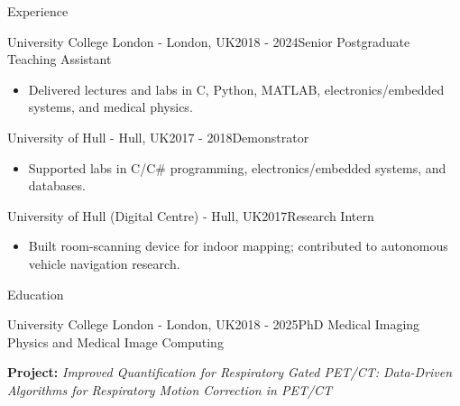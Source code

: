 \documentclass{cv}
\begin{document}
\begin{spacing}{1.1}
\begin{rSection}{Experience}
            \item \begin{rSubsection}{University College London \textnormal{- London, UK}}{2018 - 2024}{Senior Postgraduate Teaching Assistant}{}
                \item \begin{itemize}
                    \item Delivered lectures and labs in C, Python, MATLAB, electronics/embedded systems, and medical physics.
                \end{itemize}
            \end{rSubsection}
            
            \item \begin{rSubsection}{University of Hull \textnormal{- Hull, UK}}{2017 - 2018}{Demonstrator}{}
                \item \begin{itemize}
                    \item Supported labs in C/C\# programming, electronics/embedded systems, and databases.
                \end{itemize}
            \end{rSubsection}
            
            \item \begin{rSubsection}{University of Hull (Digital Centre) \textnormal{- Hull, UK}}{2017}{Research Intern}{}
                \item \begin{itemize}
                    \item Built room-scanning device for indoor mapping; contributed to autonomous vehicle navigation research.
                \end{itemize}
            \end{rSubsection}
        \end{rSection}
        
        \begin{rSection}{Education}
            \item \begin{rSubsection}{University College London \textnormal{- London, UK}}{2018 - 2025}{PhD Medical Imaging Physics and Medical Image Computing}{}            
                \item \textbf{Project:} \textit{Improved Quantification for Respiratory Gated PET/CT: Data-Driven Algorithms for Respiratory Motion Correction in PET/CT}
                

\end{rSubsection}
\end{rSection}
\end{spacing}
\end{document}

